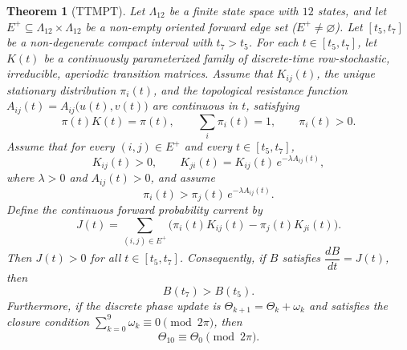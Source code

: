 \documentclass[11pt]{article}
\theoremstyle{plain}
\newtheorem{theorem}{Theorem}[section]
\theoremstyle{definition}
\newcommand{\Efwd}{E^{+}}
\begin{document}
\begin{theorem}[TTMPT]\label{thm:ttmpt}
Let $\Lambda_{12}$ be a finite state space with $12$ states, and let
$\Efwd \subseteq \Lambda_{12} \times \Lambda_{12}$ be a non-empty oriented
forward edge set ($\Efwd \neq \varnothing$). Let $[t_5, t_7]$ be a
non-degenerate compact interval with $t_7 > t_5$. For each $t \in [t_5, t_7]$,
let $K(t)$ be a continuously parameterized family of discrete-time
row-stochastic, irreducible, aperiodic transition matrices. Assume that
$K_{ij}(t)$, the unique stationary distribution $\pi_i(t)$, and the topological
resistance function $A_{ij}(t) = A_{ij}\bigl(u(t),v(t)\bigr)$ are continuous in
$t$, satisfying
\[
  \pi(t) K(t) = \pi(t), \qquad \sum_i \pi_i(t) = 1, \qquad \pi_i(t) > 0.
\]
Assume that for every $(i,j) \in \Efwd$ and every $t \in [t_5, t_7]$,
\[
  K_{ij}(t) > 0, \qquad K_{ji}(t) = K_{ij}(t)\, e^{-\lambda A_{ij}(t)},
\]
where $\lambda > 0$ and $A_{ij}(t) > 0$, and assume
\[
  \pi_i(t) > \pi_j(t)\, e^{-\lambda A_{ij}(t)}.
\]
Define the continuous forward probability current by
\[
  J(t) = \sum_{(i,j) \in \Efwd}
         \bigl( \pi_i(t) K_{ij}(t) - \pi_j(t) K_{ji}(t) \bigr).
\]
Then $J(t) > 0$ for all $t \in [t_5, t_7]$. Consequently, if $B$ satisfies
$\dfrac{dB}{dt} = J(t)$, then
\[
  B(t_7) > B(t_5).
\]
Furthermore, if the discrete phase update is $\Theta_{k+1} = \Theta_k + \omega_k$
and satisfies the closure condition $\sum_{k=0}^{9} \omega_k \equiv 0 \pmod{2\pi}$,
then
\[
  \Theta_{10} \equiv \Theta_0 \pmod{2\pi}.
\]
\end{theorem}
\end{document}
